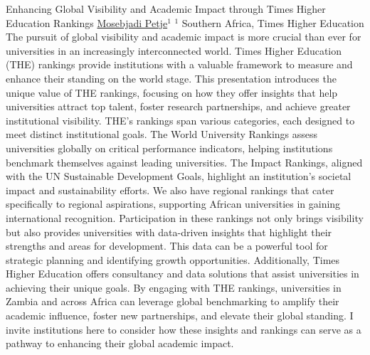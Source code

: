 
    \begin{abstract_online}{Enhancing Global Visibility and Academic Impact through Times Higher Education
Rankings}{%
        \underline{Mosebjadi Petje}$^{1}$}{%
        }{%
        $^1$  Southern Africa, Times Higher Education}
         The pursuit of global visibility and academic impact is more crucial than ever for universities
in an increasingly interconnected world. Times Higher Education (THE) rankings provide
institutions with a valuable framework to measure and enhance their standing on the world
stage. This presentation introduces the unique value of THE rankings, focusing on how they
offer insights that help universities attract top talent, foster research partnerships, and achieve
greater institutional visibility.
THE’s rankings span various categories, each designed to meet distinct institutional goals.
The World University Rankings assess universities globally on critical performance
indicators, helping institutions benchmark themselves against leading universities. The
Impact Rankings, aligned with the UN Sustainable Development Goals, highlight
an institution’s societal impact and sustainability efforts. We also have regional rankings that
cater specifically to regional aspirations, supporting African universities in gaining
international recognition.
Participation in these rankings not only brings visibility but also provides universities with
data-driven insights that highlight their strengths and areas for development. This data can be
a powerful tool for strategic planning and identifying growth opportunities. Additionally,
Times Higher Education offers consultancy and data solutions that assist universities in
achieving their unique goals.
By engaging with THE rankings, universities in Zambia and across Africa can leverage
global benchmarking to amplify their academic influence, foster new partnerships, and
elevate their global standing. I invite institutions here to consider how these insights and
rankings can serve as a pathway to enhancing their global academic impact.
    
    \end{abstract_online}
    

